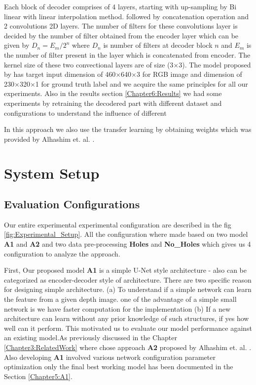 Each block of decoder comprises of 4 layers, starting with up-sampling by Bi linear with linear interpolation method. followed by concatenation operation and 2 convolutions 2D layers. The number of filters for these convolutions layer is decided by the number of filter obtained from the encoder layer which can be given by \(D_n =  {E_m} / {2^n}\) where \(D_n\) is number of filters at decoder block \(n\) and \(E_m\) is the number of filter present in the layer which is concatenated from encoder. The kernel size of these two convectional layers are of size (3$\times$3). The model proposed by  \cite{Alhashim2018} has target input dimension of 460$\times$640$\times$3 for RGB image and  dimension of 230$\times$320$\times$1 for ground truth label and we acquire the same principles for all our experiments. Also in the results section \ref{Chapter6:Results} we had some experiments by retraining the decodered part with different dataset and configurations to understand the influence of different 

In this approach we also use the transfer learning by obtaining weights which was provided by Alhashim et. al. \cite{Alhashim2018}. 


\section{System Setup}
\label{Chapter5:Experimental_Setup}
\subsection{Evaluation Configurations}

Our entire experimental experimental configuration are described in the fig \ref{fig:Experimental_Setup}. All the configuration where made based on two model \textbf{A1} and \textbf{A2} and two data pre-processing \textbf{Holes} and \textbf{No\_Holes} which gives us 4 configuration to analyze the approach. 


First, Our proposed model \textbf{A1} is a simple U-Net style architecture - also can be categorized as encoder-decoder style of architecture. There are two specific reason for designing simple architecture. (a) To understand if a simple network can learn the feature from a given depth image. one of the advantage of a simple small network is we have faster computation for the implementation (b) If a new architecture can learn without any prior knowledge of such structures, if yes how well can it perform. This motivated us to evaluate our model performance against an existing model.As previously discussed in the Chapter \ref{Chapter3:RelatedWork}  where chose approach \textbf{A2} proposed by Alhashim et. al. \cite{Alhashim2018} . Also developing \textbf{A1} involved various network configuration parameter optimization only the final best working model has been documented in the Section \ref{Chapter5:A1}. \\

